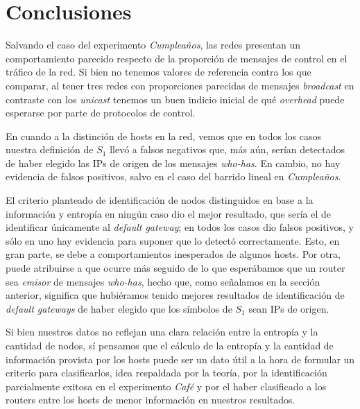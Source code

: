 \section{Conclusiones}

Salvando el caso del experimento \textit{Cumpleaños}, las redes presentan un comportamiento parecido respecto de la proporción de mensajes de control en el tráfico de la red. Si bien no tenemos valores de referencia contra los que comparar, al tener tres redes con proporciones parecidas de mensajes \textit{broadcast} en contraste con los \textit{unicast} tenemos un buen indicio inicial de qué \textit{overhead} puede esperarse por parte de protocolos de control.

En cuando a la distinción de hosts en la red, vemos que en todos los casos nuestra definición de $S_1$ llevó a falsos negativos que, más aún, serían detectados de haber elegido las IPs de origen de los mensajes \textit{who-has}. En cambio, no hay evidencia de falsos positivos, salvo en el caso del barrido lineal en \textit{Cumpleaños}.

El criterio planteado de identificación de nodos distinguidos en base a la información y entropía en ningún caso dio el mejor resultado, que sería el de identificar únicamente al \textit{default gateway}; en todos los casos dio falsos positivos, y sólo en uno hay evidencia para suponer que lo detectó correctamente. Esto, en gran parte, se debe a comportamientos inesperados de algunos hosts. Por otra, puede atribuirse a que ocurre más seguido de lo que esperábamos que un router sea \textit{emisor} de mensajes \textit{who-has}, hecho que, como señalamos en la sección anterior, significa que hubiéramos tenido mejores resultados de identificación de \textit{default gateways} de haber elegido que los símbolos de $S_1$ sean IPs de origen.

Si bien nuestros datos no reflejan una clara relación entre la entropía y la cantidad de nodos, sí pensamos que el cálculo de la entropía y la cantidad de información provista por los hosts puede ser un dato útil a la hora de formular un criterio para clasificarlos, idea respaldada por la teoría, por la identificación parcialmente exitosa en el experimento \textit{Café} y por el haber clasificado a los routers entre los hosts de menor información en nuestros resultados.

